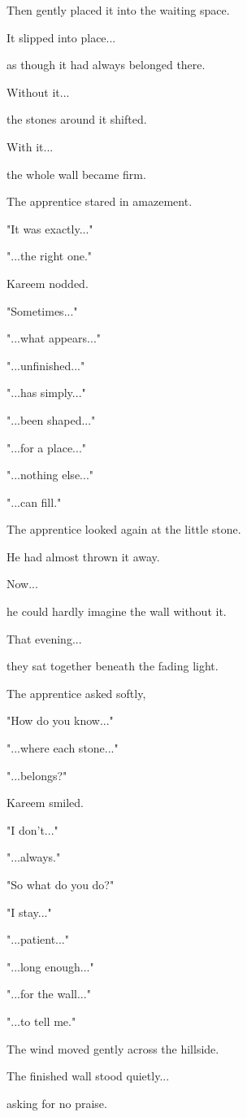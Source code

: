 \documentclass[12pt,openany]{book}
\begin{document}
Then gently placed it into the waiting space.

It slipped into place...

as though it had always belonged there.

Without it...

the stones around it shifted.

With it...

the whole wall became firm.

The apprentice stared in amazement.

"It was exactly..."

"...the right one."

Kareem nodded.

"Sometimes..."

"...what appears..."

"...unfinished..."

"...has simply..."

"...been shaped..."

"...for a place..."

"...nothing else..."

"...can fill."

The apprentice looked again at the little stone.

He had almost thrown it away.

Now...

he could hardly imagine the wall without it.

That evening...

they sat together beneath the fading light.

The apprentice asked softly,

"How do you know..."

"...where each stone..."

"...belongs?"

Kareem smiled.

"I don't..."

"...always."

"So what do you do?"

"I stay..."

"...patient..."

"...long enough..."

"...for the wall..."

"...to tell me."

The wind moved gently across the hillside.

The finished wall stood quietly...

asking for no praise.
\end{document}
